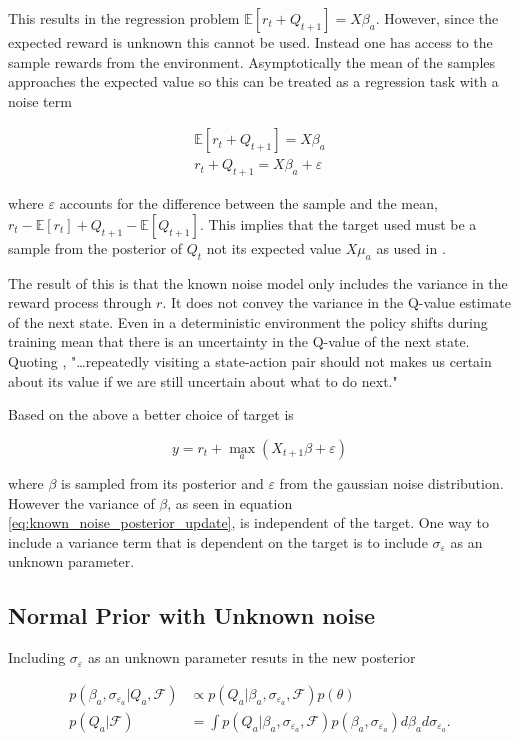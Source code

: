 This results in the regression problem $\mathbb{E}[r_t + Q_{t+1}] = X\beta_a$. However, since the expected reward is unknown this cannot be used. Instead one has access to the sample rewards from the environment. Asymptotically the mean of the samples approaches the expected value so this can be treated as a regression task with a noise term

\begin{align*}
    \mathbb{E}[r_t + Q_{t+1}] = X\beta_a \\
    r_t + Q_{t+1} = X\beta_a + \varepsilon
\end{align*}

where $\varepsilon$ accounts for the difference between the sample and the mean, $r_t - \mathbb{E}[r_t] + Q_{t+1} - \mathbb{E}[Q_{t+1}]$. This implies that the target used must be a sample from the posterior of $Q_t$ not its expected value $X\mu_a$ as used in \cite{azziz_2018}. 

The result of this is that the known noise model only includes the variance in the reward process through $r$. It does not convey the variance in the Q-value estimate of the next state. Even in a deterministic environment the policy shifts during training mean that there is an uncertainty in the Q-value of the next state. Quoting \cite{moerland_2017},  "\dots repeatedly visiting a state-action pair should not makes us certain about its value if we are still uncertain about what to do next."

Based on the above a better choice of target is

$$
y = r_t + \max_a (X_{t+1}\beta + \varepsilon)
$$

where $\beta$ is sampled from its posterior and $\varepsilon$ from the gaussian noise distribution. However the variance of $\beta$, as seen in equation \ref{eq:known_noise_posterior_update}, is independent of the target. One way to include a variance term that is dependent on the target is to include $\sigma_{\varepsilon}$ as an unknown parameter.

\subsection{Normal Prior with Unknown noise}

Including $\sigma_{\varepsilon}$ as an unknown parameter resuts in the new posterior 

\begin{align*}
    p(\beta_a, \sigma_{\varepsilon_a}|Q_a, \mathcal{F}) &\propto p(Q_a| \beta_a, \sigma_{\varepsilon_a}, \mathcal{F})p(\theta) \\
    p(Q_a|\mathcal{F}) &= \int p(Q_a|\beta_a, \sigma_{\varepsilon_a}, \mathcal{F}) p(\beta_a, \sigma_{\varepsilon_a})d\beta_a d\sigma_{\varepsilon_a}.
\end{align*}

